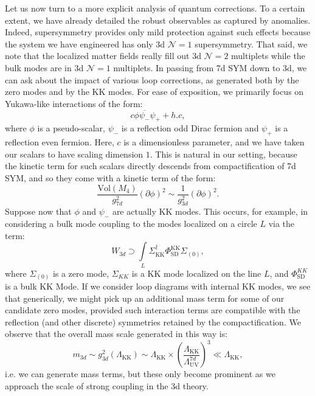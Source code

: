 \documentclass[12pt]{article}%
\numberwithin{equation}{section}
\renewcommand{\(}{\left(}
\renewcommand{\)}{\right)}
\renewcommand{\[}{\left[}
\renewcommand{\]}{\right]}
\begin{document}
Let us now turn to a more explicit analysis of quantum corrections. To a certain extent, we have already detailed
the robust observables as captured by anomalies. Indeed, supersymmetry provides
only mild protection against such effects because the system we have engineered has only 3d $\mathcal{N} = 1$ supersymmetry.
That said, we note that the localized matter fields really fill out 3d $\mathcal{N} = 2 $ multiplets while the bulk modes
are in 3d $\mathcal{N} = 1$ multiplets. In passing from 7d SYM down to 3d, we can ask about the impact of various loop corrections, as generated
both by the zero modes and by the KK modes. For ease of exposition, we primarily focus on Yukawa-like interactions of the form:
\begin{equation}
c \phi \overline{\psi_{-}} \psi_{+} + h.c,
\end{equation}
where $\phi$ is a pseudo-scalar, $\psi_{-}$ is a reflection odd Dirac fermion and $\psi_+$ is a reflection even fermion. Here,
$c$ is a dimensionless parameter, and we have taken our scalars to have scaling dimension $1$. This is natural in our setting, because the kinetic term for such scalars directly descends from compactification of 7d SYM, and so they come with a kinetic term of the form:
\begin{equation}\label{eqn:normalization}
\frac{\mathrm{Vol}(M_4)}{g^2_{7d}} (\partial \phi)^2 \sim \frac{1}{g^2_{3d}} (\partial \phi)^2.
\end{equation}
Suppose now that $\phi$ and $\psi_{-}$ are actually KK modes. This occurs, for example,
in considering a bulk mode coupling to the modes localized on a circle
$L$ via the term:
\begin{equation}
W_{3d} \supset \underset{L}{\int} \Sigma_{\mathrm{KK}}^{\dag} \Phi^{\mathrm{KK}}_{\mathrm{SD}} \Sigma_{(0)},
\end{equation}
where $\Sigma_{(0)}$ is a zero mode, $\Sigma_{KK}$ is a KK mode localized on the line $L$,
and $\Phi^{KK}_{\mathrm{SD}}$ is a bulk KK Mode. If we consider loop diagrams with internal KK modes, we see that generically,
we might pick up an additional mass term for some of our candidate zero modes, provided such interaction terms
are compatible with the reflection (and other discrete) symmetries retained by the compactification. We observe that the overall
mass scale generated in this way is:
\begin{equation}
m_{3d} \sim g^{2}_{3d}(\Lambda_{\mathrm{KK}}) \sim \Lambda_{\mathrm{KK}} \times \left( \frac{\Lambda_{\mathrm{KK}}}{\Lambda_{\mathrm{UV}}^{7d}} \right)^3 \ll \Lambda_{\mathrm{KK}},
\end{equation}
i.e. we can generate mass terms, but these only become prominent as we approach the scale of strong coupling in the 3d theory.
\end{document}

